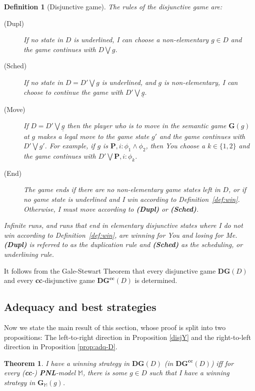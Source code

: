 \documentclass{easychair}
\newcommand{\I}{\emph{I}\xspace}
\newcommand{\You}{\emph{You}\xspace}
\newcommand{\Me}{\emph{Me}\xspace}
\newtheorem{theorem}{Theorem}
\newtheorem{definition}{Definition}
\newcommand{\PNL}{\textbf{PNL}}
\newcommand{\cc}{\textbf{cc}}
\begin{document}
\begin{definition}[Disjunctive game]\label{def:dg}
The rules of the disjunctive game are: 
\begin{description}
\item[(Dupl)] If no state in $D$ is underlined,
\I can choose a non-elementary $g\in D$ and the game continues with $D\bigvee g$.
\item[(Sched)] If no state in $D=D'\bigvee g$ is underlined,
and $g$ is non-elementary, 
    \I can choose to continue the game  with $D'\bigvee \underline{g}$.
\item[(Move)] If $D=D'\bigvee \underline{g}$ then the player who is to move in
    the semantic game $\mathbf{G}(g)$ at $g$ makes a legal move to the game
    state $g'$ and the game continues with $D' \bigvee g'$. For example, if $g$
    is $\mathbf{P},i:\phi_1 \wedge \phi_2$, then \You choose a $k\in \{1,2\}$
    and the game continues with $D'\bigvee \mathbf{P},i:\phi_k$. 
\item[(End)]
    The game ends if there are no non-elementary game states left in $D$, or if
    no game state is underlined and \I win according to
    Definition~\ref{def:win}. Otherwise, \I must move according to
    \textbf{(Dupl)} or \textbf{(Sched)}.

\end{description}

\noindent Infinite runs, and runs that end in elementary disjunctive states where \I do not win according to Definition~\ref{def:win}, are winning for \You and losing for \Me.  \textbf{(Dupl)} is referred to as the \emph{duplication rule} and \textbf{(Sched)} as the \emph{scheduling}, or \emph{underlining rule}.
\end{definition}
\noindent It follows from the Gale-Stewart Theorem that every disjunctive game $\mathbf{DG}(D)$ and every \cc-disjunctive game $\mathbf{DG}^\cc(D)$ is determined.

\subsection{Adequacy and best strategies}\label{sec:adq-D}
Now we state the main result of this section, whose proof 
is split into two propositions:  The left-to-right direction in Proposition \ref{disjY} and 
 the right-to-left direction in Proposition \ref{prop:adq-D}.

\begin{theorem}
\label{thm:adeq} \I have a winning strategy in $\mathbf{DG}(D)$ (in $\mathbf{DG}^\cc(D)$) iff for every (\cc-) \PNL-model $\mathbb{M}$, there is some $g\in D$ such that \I have a winning strategy in $\mathbf{G}_\mathbb{M}(g)$.
\end{theorem}
\end{document}

